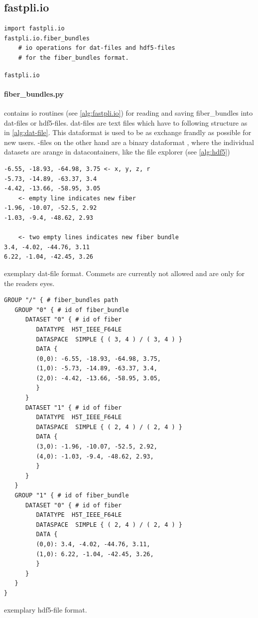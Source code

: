 \subsection{fastpli.io}
\begin{lstfloat}[!t]
\lstset{style=python}
\begin{lstlisting}
import fastpli.io
fastpli.io.fiber_bundles
    # io operations for dat-files and hdf5-files
    # for the fiber_bundles format.
\end{lstlisting}
\caption{\texttt{fastpli.io}}\label{alg:fastpli.io}
\end{lstfloat}
% 
\paragraph{fiber\_bundles.py} contains io routines (see \cref{alg:fastpli.io}) for reading and saving fiber\_bundles into dat-files or hdf5-files. dat-files are text files which have to following structure as in \cref{alg:dat-file}. This dataformat is used to be as exchange frandly as possible for new users. \hdf-files on the other hand are a binary dataformat \cite{hdf5}, where the individual datasets are arange in datacontainers, like the file explorer (see \cref{alg:hdf5})
% 
\begin{lstfloat}[!t]
\begin{lstlisting}
-6.55, -18.93, -64.98, 3.75 <- x, y, z, r
-5.73, -14.89, -63.37, 3.4
-4.42, -13.66, -58.95, 3.05
    <- empty line indicates new fiber
-1.96, -10.07, -52.5, 2.92
-1.03, -9.4, -48.62, 2.93

    <- two empty lines indicates new fiber bundle
3.4, -4.02, -44.76, 3.11
6.22, -1.04, -42.45, 3.26
\end{lstlisting}
\caption{exemplary dat-file format. Commets are currently not allowed and are only for the readers eyes.}\label{alg:dat-file}
\end{lstfloat}
% 
\begin{lstfloat}[!t]
\lstset{style=common}
\begin{lstlisting}
GROUP "/" { # fiber_bundles path
   GROUP "0" { # id of fiber_bundle
      DATASET "0" { # id of fiber
         DATATYPE  H5T_IEEE_F64LE
         DATASPACE  SIMPLE { ( 3, 4 ) / ( 3, 4 ) }
         DATA {
         (0,0): -6.55, -18.93, -64.98, 3.75,
         (1,0): -5.73, -14.89, -63.37, 3.4,
         (2,0): -4.42, -13.66, -58.95, 3.05,
         }
      }
      DATASET "1" { # id of fiber
         DATATYPE  H5T_IEEE_F64LE
         DATASPACE  SIMPLE { ( 2, 4 ) / ( 2, 4 ) }
         DATA {
         (3,0): -1.96, -10.07, -52.5, 2.92,
         (4,0): -1.03, -9.4, -48.62, 2.93,
         }
      }
   }
   GROUP "1" { # id of fiber_bundle
      DATASET "0" { # id of fiber
         DATATYPE  H5T_IEEE_F64LE
         DATASPACE  SIMPLE { ( 2, 4 ) / ( 2, 4 ) }
         DATA {
         (0,0): 3.4, -4.02, -44.76, 3.11,
         (1,0): 6.22, -1.04, -42.45, 3.26,
         }
      }
   }
}
\end{lstlisting}
\caption{exemplary hdf5-file format.} \label{alg:hdf5}
\end{lstfloat}
% 
% 
